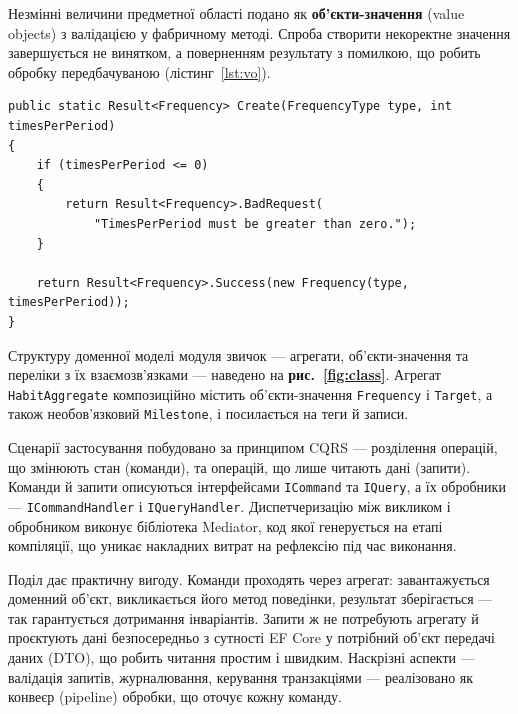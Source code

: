 Незмінні величини предметної області подано як \textbf{об'єкти-значення} (value objects) з валідацією у фабричному методі. Спроба створити некоректне значення завершується не винятком, а поверненням результату з помилкою, що робить обробку передбачуваною (лістинг~\ref{lst:vo}).

\begin{lstlisting}[style=nocodeframe, caption={Об'єкт-значення Frequency із валідацією}, label={lst:vo}]
public static Result<Frequency> Create(FrequencyType type, int timesPerPeriod)
{
    if (timesPerPeriod <= 0)
    {
        return Result<Frequency>.BadRequest(
            "TimesPerPeriod must be greater than zero.");
    }

    return Result<Frequency>.Success(new Frequency(type, timesPerPeriod));
}
\end{lstlisting}

Структуру доменної моделі модуля звичок — агрегати, об'єкти-значення та переліки з їх взаємозв'язками — наведено на \textbf{рис.~\ref{fig:class}}. Агрегат \texttt{HabitAggregate} композиційно містить об'єкти-значення \texttt{Frequency} і \texttt{Target}, а також необов'язковий \texttt{Milestone}, і посилається на теги й записи.



Сценарії застосування побудовано за принципом CQRS — розділення операцій, що змінюють стан (команди), та операцій, що лише читають дані (запити). Команди й запити описуються інтерфейсами \texttt{ICommand} та \texttt{IQuery}, а їх обробники — \texttt{ICommandHandler} і \texttt{IQueryHandler}. Диспетчеризацію між викликом і обробником виконує бібліотека Mediator, код якої генерується на етапі компіляції, що уникає накладних витрат на рефлексію під час виконання.

Поділ дає практичну вигоду. Команди проходять через агрегат: завантажується доменний об'єкт, викликається його метод поведінки, результат зберігається — так гарантується дотримання інваріантів. Запити ж не потребують агрегату й проєктують дані безпосередньо з сутності EF Core у потрібний об'єкт передачі даних (DTO), що робить читання простим і швидким. Наскрізні аспекти — валідація запитів, журналювання, керування транзакціями — реалізовано як конвеєр (pipeline) обробки, що оточує кожну команду.


